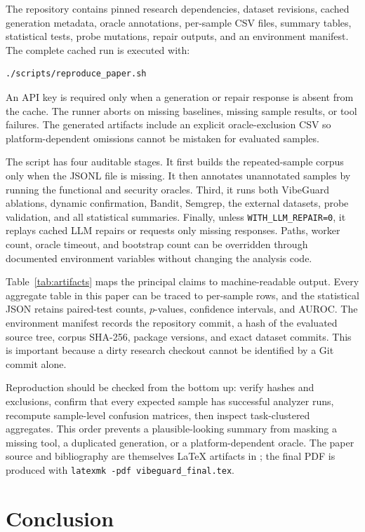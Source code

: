 \documentclass[sigconf,nonacm]{acmart}
\begin{document}
The repository contains pinned research dependencies, dataset revisions,
cached generation metadata, oracle annotations, per-sample CSV files, summary
tables, statistical tests, probe mutations, repair outputs, and an environment
manifest. The complete cached run is executed with:
\begin{verbatim}
./scripts/reproduce_paper.sh
\end{verbatim}
An API key is required only when a generation or repair response is absent from
the cache. The runner aborts on missing baselines, missing sample results, or
tool failures. The generated artifacts include an explicit
oracle-exclusion CSV so platform-dependent omissions cannot be mistaken for
evaluated samples.

The script has four auditable stages. It first builds the repeated-sample corpus
only when the JSONL file is missing. It then annotates unannotated samples by
running the functional and security oracles. Third, it runs both VibeGuard
ablations, dynamic confirmation, Bandit, Semgrep, the external datasets, probe
validation, and all statistical summaries. Finally, unless
\texttt{WITH\_LLM\_REPAIR=0}, it replays cached LLM repairs or requests only
missing responses. Paths, worker count, oracle timeout, and bootstrap count can
be overridden through documented environment variables without changing the
analysis code.

Table~\ref{tab:artifacts} maps the principal claims to machine-readable output.
Every aggregate table in this paper can be traced to per-sample rows, and the
statistical JSON retains paired-test counts, $p$-values, confidence intervals,
and AUROC. The environment manifest records the repository commit, a hash of
the evaluated source tree, corpus SHA-256, package versions, and exact dataset
commits. This is important because a dirty research checkout cannot be
identified by a Git commit alone.

Reproduction should be checked from the bottom up: verify hashes and exclusions,
confirm that every expected sample has successful analyzer runs, recompute
sample-level confusion matrices, then inspect task-clustered aggregates. This
order prevents a plausible-looking summary from masking a missing tool, a
duplicated generation, or a platform-dependent oracle. The paper source and
bibliography are themselves LaTeX artifacts in ; the final PDF is
produced with \texttt{latexmk -pdf vibeguard\_final.tex}.

\section{Conclusion}
\end{document}
